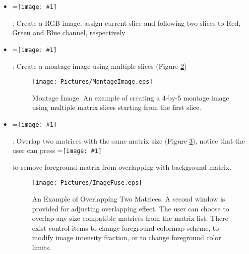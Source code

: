 \documentclass{book}%
\newcommand{\vcenteredinclude}[1]{
\begingroup
\setbox0=\hbox{\texttt{[image: \#1]}}
\parbox{\wd0}{\box0}\endgroup}
\begin{document}
\begin{enumerate}
\begin{itemize}
			\begin{itemize}
					\item \vcenteredinclude{Pictures/RedBar.eps} : Activate or deactivate localizer line on main display
					\item \vcenteredinclude{Pictures/YellowBar.eps} : Activate or deactivate localizer line on main display
					\item \vcenteredinclude{Pictures/Switch.eps} : Switch matrices between main display and second display. This operation simply permutes current matrix into its orthogonal version. The user can save the transformed matrix using (\vcenteredinclude{Pictures/Upload.eps}).
			\end{itemize}

			\begin{figure}[htbp]
				\centering
					\texttt{[image: Pictures/3DSlice.eps]}
				\caption{3D Slicer. To change view slice, the user needs to activate localizer line and then click on desired coordinate on the main display window.}
				\label{fig:3DSlice}
			\end{figure}	

		\item \vcenteredinclude{Pictures/RGBImage.eps} : Create a RGB image, assign current slice and following two slices to Red, Green and Blue channel, respectively
		\item \vcenteredinclude{Pictures/Montage.eps} : Create a montage image using multiple slices (Figure \ref{fig:MontageImage})
		
		\begin{figure}[htbp]
			\centering
				\texttt{[image: Pictures/MontageImage.eps]}
			\caption{Montage Image. An example of creating a 4-by-5 montage image using multiple matrix slices starting from the first slice.}
			\label{fig:MontageImage}
		\end{figure}
		
		\item \vcenteredinclude{Pictures/Fuse.eps} : Overlap two matrices with the same matrix size (Figure \ref{fig:ImageFuse}), notice that the user can press \vcenteredinclude{Pictures/Release.eps} to remove foreground matrix from overlapping with background matrix.
		
	\begin{figure}[htbp]
		\centering
			\texttt{[image: Pictures/ImageFuse.eps]}
		\caption{An Example of Overlapping Two Matrices. A second window is provided for adjusting overlapping effect. The user can choose to overlap any size compatible matrices from the matrix list. There exist control items to change foreground colormap scheme, to modify image intensity fraction, or to change foreground color limits.}
		\label{fig:ImageFuse}
	\end{figure}		
	

\end{itemize}
\end{enumerate}
\end{document}
